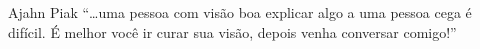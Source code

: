 
\begin{quotepage}{0.5\linewidth}{Ajahn Piak}
“…uma pessoa com visão boa explicar algo a uma pessoa cega é difícil. É
melhor você ir curar sua visão, depois venha conversar comigo!”
\end{quotepage}

